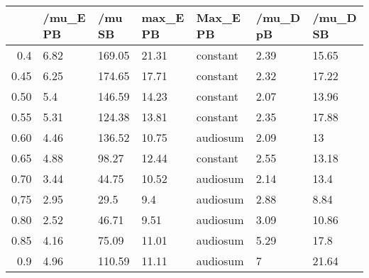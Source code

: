 \begin{table}[ht]
\centering
\begin{tabular}{rllllll}
  \hline
 & /mu\_E PB & /mu SB & max\_E PB & Max\_E PB & /mu\_D pB & /mu\_D SB \\ 
  \hline
0.4 & 6.82 & 169.05 & 21.31 & constant & 2.39 & 15.65 \\ 
  0.45 & 6.25 & 174.65 & 17.71 & constant & 2.32 & 17.22 \\ 
  0.50 & 5.4 & 146.59 & 14.23 & constant & 2.07 & 13.96 \\ 
  0.55 & 5.31 & 124.38 & 13.81 & constant & 2.35 & 17.88 \\ 
  0.60 & 4.46 & 136.52 & 10.75 & audiosum & 2.09 & 13 \\ 
  0.65 & 4.88 & 98.27 & 12.44 & constant & 2.55 & 13.18 \\ 
  0.70 & 3.44 & 44.75 & 10.52 & audiosum & 2.14 & 13.4 \\ 
  0,75 & 2.95 & 29.5 & 9.4 & audiosum & 2.88 & 8.84 \\ 
  0.80 & 2.52 & 46.71 & 9.51 & audiosum & 3.09 & 10.86 \\ 
  0.85 & 4.16 & 75.09 & 11.01 & audiosum & 5.29 & 17.8 \\ 
  0.9 & 4.96 & 110.59 & 11.11 & audiosum & 7 & 21.64 \\ 
   \hline
\end{tabular}
\end{table}
